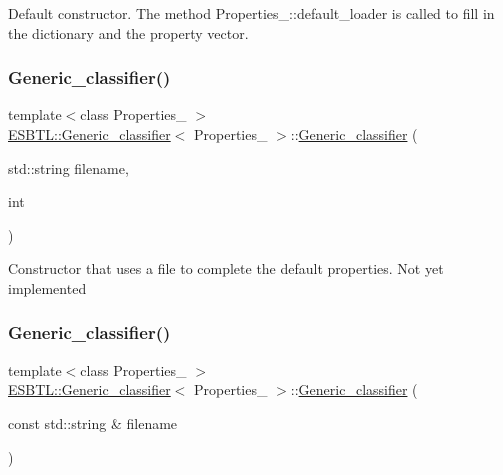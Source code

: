 Default constructor. The method Properties\+\_\+\+::default\+\_\+loader is called to fill in the dictionary and the property vector. \mbox{\label{structESBTL_1_1Generic__classifier_a9e7fad423ff513e510626ac3a7a9c666}} 
\subsubsection{\texorpdfstring{Generic\+\_\+classifier()}{Generic\_classifier()}\hspace{0.1cm}{\footnotesize\ttfamily [2/3]}}
{\footnotesize\ttfamily template$<$class Properties\+\_\+ $>$ \\
\hyperlink{structESBTL_1_1Generic__classifier}{E\+S\+B\+T\+L\+::\+Generic\+\_\+classifier}$<$ Properties\+\_\+ $>$\+::\hyperlink{structESBTL_1_1Generic__classifier}{Generic\+\_\+classifier} (\begin{DoxyParamCaption}\item[{std\+::string}]{filename,  }\item[{int}]{ }\end{DoxyParamCaption})\hspace{0.3cm}{\ttfamily [inline]}}

Constructor that uses a file to complete the default properties. Not yet implemented \mbox{\label{structESBTL_1_1Generic__classifier_adc911aefb50341cdb6e31cea019cdc5c}} 
\subsubsection{\texorpdfstring{Generic\+\_\+classifier()}{Generic\_classifier()}\hspace{0.1cm}{\footnotesize\ttfamily [3/3]}}
{\footnotesize\ttfamily template$<$class Properties\+\_\+ $>$ \\
\hyperlink{structESBTL_1_1Generic__classifier}{E\+S\+B\+T\+L\+::\+Generic\+\_\+classifier}$<$ Properties\+\_\+ $>$\+::\hyperlink{structESBTL_1_1Generic__classifier}{Generic\+\_\+classifier} (\begin{DoxyParamCaption}\item[{const std\+::string \&}]{filename }\end{DoxyParamCaption})\hspace{0.3cm}{\ttfamily [inline]}}

